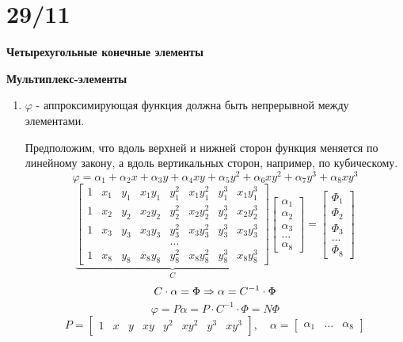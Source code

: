 \documentclass{bmstu}
\begin{document}
	\section*{29/11}
	\begin{center}
	\textbf{Четырехугольные конечные элементы}
	
	\textbf{Мультиплекс-элементы}
	\end{center}
	
	\begin{enumerate}
		\item $\varphi$ - аппроксимирующая функция должна быть непрерывной между элементами. 
		
		Предположим, что вдоль верхней и нижней сторон функция меняется по линейному закону, а вдоль вертикальных сторон, например, по кубическому.
		\[
		\varphi=\alpha_1+\alpha_2x+\alpha_3y+\alpha_4xy+\alpha_5y^2+\alpha_6xy^2+\alpha_7y^3+\alpha_8xy^3
		\]
		\[
		\underbrace{\begin{bmatrix}
			1 & x_1 & y_1 & x_1y_1 & y_1^2 & x_1y_1^2 & y_1^3 & x_1y_1^3 \\
			1 & x_2 & y_2 & x_2y_2 & y_2^2 & x_2y_2^2 & y_2^3 & x_2y_2^3 \\
			1 & x_3 & y_3 & x_3y_3 & y_3^2 & x_3y_3^2 & y_3^3 & x_3y_3^3 \\
			& & &  & \dots& & &  \\
			1 & x_8 & y_8 & x_8y_8 & y_8^2 & x_8y_8^2 & y_8^3 & x_8y_8^3 
		\end{bmatrix}}_C \begin{bmatrix}
		\alpha_1 \\ \alpha_2 \\ \alpha_3 \\ \dots \\ \alpha_8 
		\end{bmatrix} = \begin{bmatrix}
		\Phi_1 \\ \Phi_2 \\ \Phi_3 \\ \dots \\ \Phi_8
		\end{bmatrix}
		\]
		\[
		C\cdot\alpha=\Phi \Rightarrow \alpha=C^{-1} \cdot \Phi \\
		\]
		\[
		\varphi=P\alpha=P\cdot C^{-1} \cdot \Phi = N\Phi
		\]
		\[
		P=\begin{bmatrix}
			1 & x & y & xy & y^2 & xy^2 & y^3 & xy^3
		\end{bmatrix}, \quad \alpha=\begin{bmatrix}
		\alpha_1 & \dots & \alpha_8
		\end{bmatrix}
		\]
		

\end{enumerate}
\end{document}
